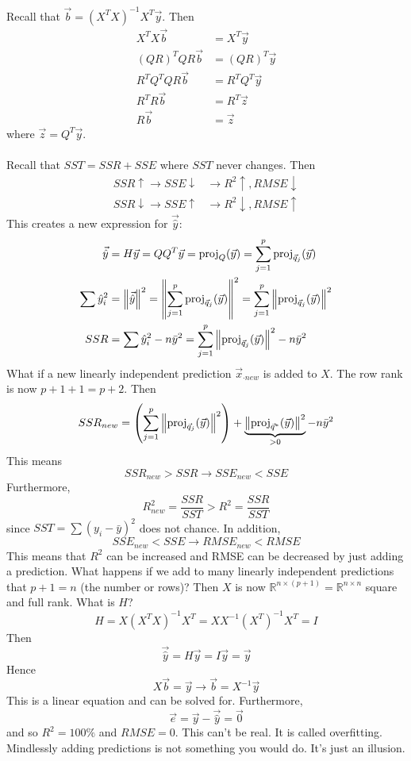 \documentclass[12pt]{article}
\begin{document}
Recall that $\vec{b} = (X^TX)^{-1}X^T\vec{y}$. Then $$ \begin{aligned} X^TX\vec{b} &= X^T\vec{y} \\ (QR)^T QR \vec{b} &= (QR)^T\vec{y} \\ R^T Q^TQ R\vec{b} &= R^TQ^T\vec{y} \\ R^TR \vec{b} &= R^T\vec{z} \\ R\vec{b} &= \vec{z} \end{aligned} $$ where $\vec{z} = Q^T\vec{y}$. \\~\\
Recall that $SST = SSR + SSE$ where $SST$ never changes. Then $$ \begin{aligned} SSR \uparrow \to SSE \downarrow &\to R^2 \uparrow, RMSE \downarrow \\ SSR \downarrow \to SSE \uparrow &\to R^2 \downarrow, RMSE \uparrow \end{aligned} $$ 
This creates a new expression for $\vec{\hat{y}}$: 
$$ \begin{aligned} \vec{\hat{y}} &= H\vec{y} = QQ^T\vec{y} = \text{proj}_{ Q } ( \vec{y} ) = \sum_{j=1}^p \text{proj}_{ \vec{q}_j } ( \vec{y} ) \\ \sum \hat{y}_i^2 &= \norm{\vec{\hat{y}}}^2 = \norm{\sum_{j=1}^p \text{proj}_{ \vec{q}_j } ( \vec{y} )}^2 = \sum_{j=1}^p \norm{\text{proj}_{ \vec{q}_j } ( \vec{y} )}^2 \\ SSR &= \sum \hat{y}_i^2 - n\bar{y}^2 = \sum_{j=1}^p \norm{\text{proj}_{ \vec{q}_j } ( \vec{y} )}^2 - n\bar{y}^2 \end{aligned} $$
 What if a new linearly independent prediction $\vec{x}_{\cdot new}$ is added to $X$. The row rank is now $p+1+1 = p+2$. Then $$ SSR_{new} = \left( \sum_{j=1}^p \norm{\text{proj}_{ \vec{q}_j } ( \vec{y} )}^2\right) + \underbrace{ \norm{\text{proj}_{ \vec{q}^* } ( \vec{y} )}^2}_{> 0} - n\bar{y}^2$$ 
 This means $$SSR_{new} > SSR \to SSE_{new} < SSE $$ 
 Furthermore, $$R^2_{new} = \frac{SSR}{SST} > R^2 = \frac{SSR}{SST}$$ since $SST = \sum (y_i - \bar{y})^2$ does not chance. In addition, $$SSE_{new} < SSE \to RMSE_{new} < RMSE $$ 
 This means that $R^2$ can be increased and RMSE can be decreased by just adding a prediction. What happens if we add to many linearly independent predictions that $p+1=n$ (the number or rows)? Then $X$ is now $\mathbb{R}^{n \times (p+1)} = \mathbb{R}^{n \times n}$ square and full rank. What is $H$? 
 $$H = X(X^TX)^{-1}X^T = XX^{-1}(X^T)^{-1}X^T = I $$ 
 Then $$\vec{\hat{y}} = H\vec{y} = I\vec{y} = \vec{y}$$ 
 Hence $$X\vec{b} = \vec{y} \to \vec{b} = X^{-1}\vec{y} $$
 This is a linear equation and can be solved for. Furthermore, $$\vec{e} = \vec{y} - \vec{\hat{y}} = \vec{0}$$ and so $R^2 = 100 \%$ and $RMSE = 0$. This can't be real. It is called overfitting. Mindlessly adding predictions is not something you would do. It's just an illusion. \\~\\
\end{document}
